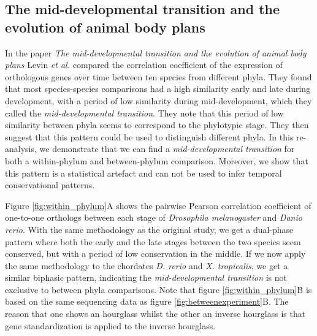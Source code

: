\subsection{The mid-developmental transition and the evolution of animal body plans} \label{subsection:levin}

In the paper \textit{The mid-developmental transition and the evolution of animal body plans}\cite{Levin2016} Levin \textit{et al.} compared the correlation coefficient of the expression of orthologous genes over time between ten species from different phyla. They found that most species-species comparisons had a high similarity early and late during development, with a period of low similarity during mid-development, which they called the \textit{mid-developmental transition}. They note that this period of low similarity between phyla seems to correspond to the phylotypic stage. They then suggest that this pattern could be used to distinguish different phyla. In this re-analysis, we demonstrate that we can find a \textit{mid-developmental transition} for both a within-phylum and between-phylum comparison. Moreover, we show that this pattern is a statistical artefact and can not be used to infer temporal conservational patterns.

Figure \ref{fig:within_phylum}A shows the pairwise Pearson correlation coefficient of one-to-one orthologs between each stage of \textit{Drosophila melanogaster} and \textit{Danio rerio}. With the same methodology as the original study, we get a dual-phase pattern where both the early and the late stages between the two species seem conserved, but with a period of low conservation in the middle. If we now apply the same methodology to the chordates \textit{D. rerio} and \textit{X. tropicalis}, we get a similar biphasic pattern, indicating the \textit{mid-developmental transition} is not exclusive to between phyla comparisons. Note that figure \ref{fig:within_phylum}B is based on the same sequencing data as figure \ref{fig:betweenexperiment}B. The reason that one shows an hourglass whilst the other an inverse hourglass is that gene standardization is applied to the inverse hourglass.

